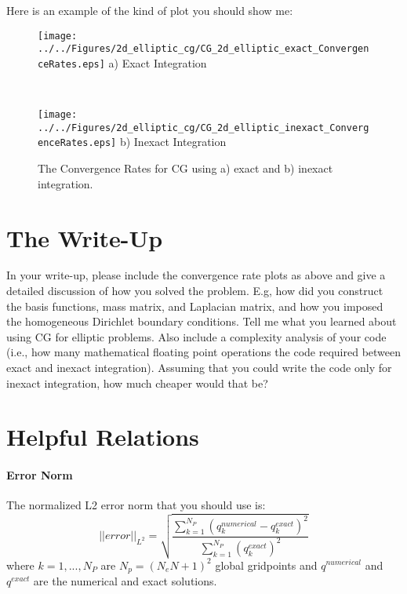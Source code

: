 \documentclass[10pt]{article}
\newcommand{\be}{\begin{equation}}
\newcommand{\ee}{\end{equation}}
\begin{document}
Here is an example of the kind of plot you should show me:
\begin{figure}[h]
\begin{center}
\begin{minipage}{2.20in}
\texttt{[image: ../../Figures/2d\_elliptic\_cg/CG\_2d\_elliptic\_exact\_ConvergenceRates.eps]}
a) Exact Integration 
\end{minipage} \ \hspace{0.125in} \
\begin{minipage}{2.20in}
\texttt{[image: ../../Figures/2d\_elliptic\_cg/CG\_2d\_elliptic\_inexact\_ConvergenceRates.eps]}
b) Inexact Integration
\end{minipage} 
\caption{The Convergence Rates for CG using a) exact and b) inexact integration.}
\end{center}
\end{figure}

\clearpage

\section{The Write-Up}
In your write-up, please include the convergence rate plots as above and give a detailed discussion of how you solved the 
problem. E.g, how did you construct the basis functions, mass matrix, and Laplacian matrix, and how you imposed the 
homogeneous Dirichlet boundary conditions. Tell me what you learned about using CG for elliptic problems. Also include a complexity analysis 
of your code (i.e., how many mathematical floating point operations the code required between exact and inexact integration). Assuming 
that you could write the code only for inexact integration, how much cheaper would that be?

\section{Helpful Relations}

\paragraph{Error Norm}
The normalized L2 error norm that you should use is:
\be
||error||_{L^2} = \sqrt{ \frac{ \sum_{k=1}^{N_P}  \left( q^{numerical}_k - q^{exact}_k \right)^2}{ \sum_{k=1}^{N_P} \left( q^{exact}_k \right) ^2} }
\ee
where $k=1,...,N_P$ are $N_p=(N_e N + 1)^2 $ global gridpoints and $q^{numerical}$ and $q^{exact}$ are the numerical and exact solutions.
\end{document}
